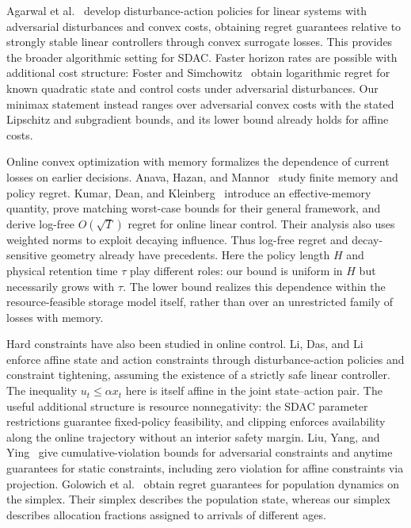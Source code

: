 \documentclass[11pt]{article}
\begin{document}
Agarwal et al.~\cite{agarwal2019online} develop disturbance-action
policies for linear systems with adversarial disturbances and convex
costs, obtaining regret guarantees relative to strongly stable linear
controllers through convex surrogate losses. This provides the broader
algorithmic setting for SDAC. Faster horizon rates are possible with
additional cost structure: Foster and
Simchowitz~\cite{foster2020logarithmic} obtain logarithmic regret for
known quadratic state and control costs under adversarial disturbances.
Our minimax statement instead ranges over adversarial convex costs
with the stated Lipschitz and subgradient bounds, and its lower bound
already holds for affine costs.

Online convex optimization with memory formalizes the dependence of
current losses on earlier decisions. Anava, Hazan, and
Mannor~\cite{anava2015memory} study finite memory and policy regret.
Kumar, Dean, and Kleinberg~\cite{kumar2023unbounded} introduce an
effective-memory quantity, prove matching worst-case bounds for their
general framework, and derive log-free $O(\sqrt T)$ regret for online
linear control. Their analysis also uses weighted norms to exploit
decaying influence. Thus log-free regret and decay-sensitive geometry
already have precedents. Here the policy length $H$ and physical
retention time $\tau$ play different roles: our bound is uniform in
$H$ but necessarily grows with $\tau$. The lower bound realizes this
dependence within the resource-feasible storage model itself, rather
than over an unrestricted family of losses with memory.

Hard constraints have also been studied in online control.
Li, Das, and Li~\cite{li2021onlineConstrained} enforce affine state
and action constraints through disturbance-action policies and
constraint tightening, assuming the existence of a strictly safe
linear controller.
The inequality $u_t\le\alpha x_t$ here is itself affine in the joint
state--action pair. The useful additional structure is resource
nonnegativity: the SDAC parameter restrictions guarantee fixed-policy
feasibility, and clipping enforces availability along the online
trajectory without an interior safety margin. Liu, Yang, and
Ying~\cite{liu2023constraints} give cumulative-violation bounds for
adversarial constraints and anytime guarantees for static constraints,
including zero violation for affine constraints via projection. Golowich
et al.~\cite{golowich2024population} obtain regret guarantees for
population dynamics on the simplex. Their simplex describes the
population state, whereas our simplex describes allocation fractions
assigned to arrivals of different ages.
\end{document}
